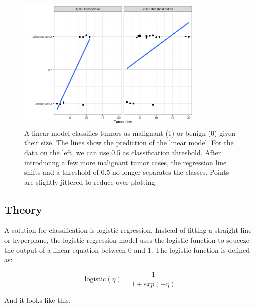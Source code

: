 \documentclass[
  10pt,
]{scrbook}
\begin{document}
\begin{figure}

{\centering \includegraphics[width=0.8\textwidth]{images/linear-class-threshold-1} 

}

\caption{A linear model classifies tumors as malignant (1) or benign (0) given their size. The lines show the prediction of the linear model. For the data on the left, we can use 0.5 as classification threshold. After introducing a few more malignant tumor cases, the regression line shifts and a threshold of 0.5 no longer separates the classes. Points are slightly jittered to reduce over-plotting. }\label{fig:linear-class-threshold}
\end{figure}

\hypertarget{theory}{%
\subsection{Theory}\label{theory}}

A solution for classification is logistic regression.
Instead of fitting a straight line or hyperplane, the logistic regression model uses the logistic function to squeeze the output of a linear equation between 0 and 1.
The logistic function is defined as:

\[\text{logistic}(\eta)=\frac{1}{1+exp(-\eta)}\]

And it looks like this:
\end{document}
